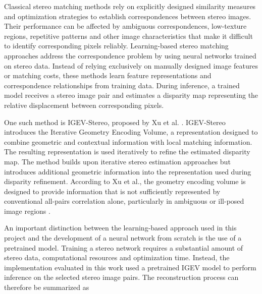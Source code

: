 Classical stereo matching methods rely on explicitly designed similarity measures and optimization strategies to establish correspondences between stereo images. Their performance can be affected by ambiguous correspondences, low-texture regions, repetitive patterns and other image characteristics that make it difficult to identify corresponding pixels reliably. Learning-based stereo matching approaches address the correspondence problem by using neural networks trained on stereo data. Instead of relying exclusively on manually designed image features or matching costs, these methods learn feature representations and correspondence relationships from training data. During inference, a trained model receives a stereo image pair and estimates a disparity map representing the relative displacement between corresponding pixels.

One such method is IGEV-Stereo, proposed by Xu et al. \cite{xu_iterative_2023}. IGEV-Stereo introduces the Iterative Geometry Encoding Volume, a representation designed to combine geometric and contextual information with local matching information. The resulting representation is used iteratively to refine the estimated disparity map. The method builds upon iterative stereo estimation approaches but introduces additional geometric information into the representation used during disparity refinement. According to Xu et al., the geometry encoding volume is designed to provide information that is not sufficiently represented by conventional all-pairs correlation alone, particularly in ambiguous or ill-posed image regions \cite{xu_iterative_2023}.

An important distinction between the learning-based approach used in this project and the development of a neural network from scratch is the use of a pretrained model. Training a stereo network requires a substantial amount of stereo data, computational resources and optimization time. Instead, the implementation evaluated in this work used a pretrained IGEV model to perform inference on the selected stereo image pairs.
The reconstruction process can therefore be summarized as

\begin{center}
\end{center}

